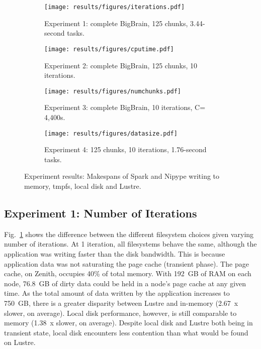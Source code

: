 \documentclass{IEEEtran}
\begin{document}

\begin{figure*}
\begin{subfigure}{\columnwidth}
    \centering
    \texttt{[image: results/figures/iterations.pdf]}%
    \caption{Experiment 1: complete BigBrain, 125 chunks, 3.44-second tasks.}\label{fig:iterations}
\end{subfigure}
\begin{subfigure}{\columnwidth}
    \centering
    \texttt{[image: results/figures/cputime.pdf]}
    \caption{Experiment 2: complete BigBrain, 125 chunks, 10 iterations.}\label{fig:cputime}
\end{subfigure}
\begin{subfigure}{\columnwidth}
    \centering
    \texttt{[image: results/figures/numchunks.pdf]}
    \caption{Experiment 3: complete BigBrain, 10 iterations, C= 4,400s.}\label{fig:numchunks}
\end{subfigure}
\begin{subfigure}{\columnwidth}
    \centering
    \texttt{[image: results/figures/datasize.pdf]}
    \caption{Experiment 4: 125 chunks, 10 iterations, 1.76-second tasks.}\label{fig:datasize}
\end{subfigure}
\setlength{\belowcaptionskip}{-10pt}
\caption{Experiment results: Makespans of Spark and Nipype writing to memory, tmpfs, local disk and Lustre.}
\label{fig:results}
\end{figure*}
\subsection{Experiment 1: Number of Iterations}

Fig.~\ref{fig:iterations} shows the difference between the different 
filesystem choices given varying number of iterations. At 1 iteration, all 
filesystems behave the same, although the application was writing faster than the
disk bandwidth. This is because application data was not saturating the page cache
(transient phase). The page cache, on Zenith, occupies 40\% of 
total memory. With 192~GB of RAM on each node, 76.8~GB of 
dirty data could be held in a node's page cache at any given time.
As the total amount of data written by the 
application increases to 750~GB, there is a greater disparity between 
Lustre and in-memory (2.67~x slower, on average). Local disk 
performance, however, 
is still comparable to memory (1.38~x slower, on average). Despite local disk and 
Lustre both being in transient state, local disk encounters less contention 
than what would be found on Lustre. 
\end{document}
